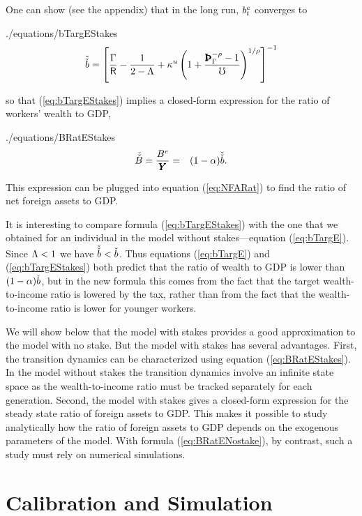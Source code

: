 \documentclass[titlepage,abstract,letterpaper]{econtex}
\renewcommand{\GDPLev}{\ensuremath{\pmb{Y}}}
\begin{document}
One can show (see the appendix) that in the long run, $b^{e}_t$ converges to
\begin{verbatimwrite}{./equations/bTargEStakes}
\begin{equation}
 \bTargTarg = \left[\frac{\PGro}{\Rfree}-\frac{1}{2-\LGro}+\MPCU \left(1+\frac{\PatPGro^{-\CRRA}-1}{\urate}\right)^{1/\CRRA}\right]^{-1}
\label{eq:bTargEStakes}
\end{equation}
\end{verbatimwrite}

so that (\ref{eq:bTargEStakes}) implies a closed-form expression for the ratio of workers' wealth to GDP,
\begin{verbatimwrite}{./equations/BRatEStakes}
\begin{eqnarray}
\BTargTarg = \frac{\BLevE}{\GDPLev} & = & (1-\kapShare ) \bTargTarg.
\label{eq:BRatEStakes}
\end{eqnarray}
\end{verbatimwrite}

This expression can be plugged into equation (\ref{eq:NFARat}) to find the ratio of net foreign assets to GDP.

It is interesting to compare formula (\ref{eq:bTargEStakes}) with the
one that we obtained for an individual in the model without
stakes---equation (\ref{eq:bTargE}). Since $\Lambda<1$ we have
$\check{\check{b}} < \check{b}$. Thus
equations (\ref{eq:bTargE}) and (\ref{eq:bTargEStakes}) both predict
that the ratio of wealth to GDP is lower than $(1-\alpha)
\check{b}$, but in the new formula this comes from the
fact that the target wealth-to-income ratio is lowered by the tax,
rather than from the fact that the wealth-to-income ratio is lower for
younger workers.

We will show below that the model with stakes provides a good
approximation to the model with no stake.  But the model with stakes has
several advantages. First, the transition dynamics can be
characterized using equation (\ref{eq:BRatEStakes}). In the model
without stakes the transition dynamics involve an infinite state space
as the wealth-to-income ratio must be tracked separately for each
generation. Second, the model with stakes gives a closed-form
expression for the steady state ratio of foreign assets to GDP. This
makes it possible to study analytically how the ratio of foreign
assets to GDP depends on the exogenous parameters of the model. With
formula (\ref{eq:BRatENostake}), by contrast, such a study must rely
on numerical simulations.

\section{Calibration and Simulation}
\end{document}
